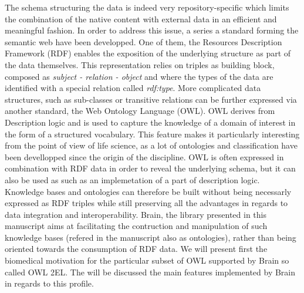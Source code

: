 \documentclass{bioinfo}
\begin{document}
The schema structuring the data is indeed very repository-specific which limits the combination of the native content with external data in an
efficient and meaningful fashion. In order to address this issue, a series a standard forming the semantic web have been developped. One of them,
the Resources Description Framework (RDF) enables the exposition of the underlying structure as part of the data themselves. This
representation relies on triples as building block, composed as \emph{subject - relation - object} and where 
the types of the data are identified with a special relation called \emph{rdf:type}. More complicated data structures, such as sub-classes or
transitive relations can be further expressed via another standard, the Web Ontology Language (OWL). OWL derives from Description logic and
is used to capture the knowledge of a domain of interest in the form of a structured vocabulary. This feature makes it particularly 
interesting from the point of view of life science, as a lot of ontologies and classification have been devellopped since the origin of 
the discipline. OWL is often expressed in combination with RDF data in order to reveal the underlying schema, but 
it can also be used as such as an implemetation of a part of description logic. 
Knowledge bases and ontologies can therefore be built without being necessarly expressed as RDF triples while still preserving all the 
advantages in regards to data integration and interoperability.
Brain, the library presented in this manuscript aims at facilitating the contruction and manipulation of 
such knowledge bases (refered in the manuscript also as ontologies), rather than being oriented towards the consumption of RDF data. 
We will present first the biomedical motivation for the particular subset of OWL supported by Brain so called OWL 2EL. 
The will be discussed the main features implemented by Brain in regards to this profile.
\end{document}
